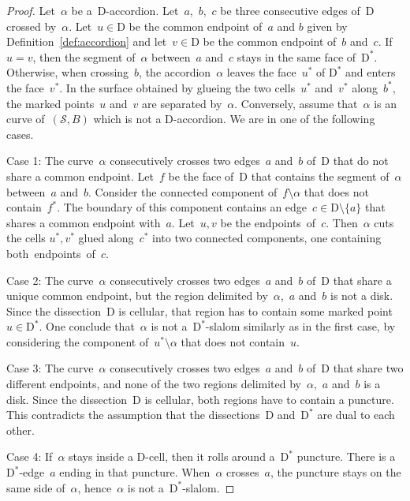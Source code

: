 \documentclass{amsart}
\theoremstyle{definition}
\newcommand{\surface}{\mathcal{S}} %
\newcommand{\dual}{^*} %
\newcommand{\dissection}{\mathrm{D}} %
\begin{document}
\begin{proof}
Let~$\alpha$ be a~$\dissection$-accordion.
Let~$a$,~$b$,~$c$ be three consecutive edges of~$\dissection$ crossed by~$\alpha$.
Let~$u \in \dissection$ be the common endpoint of~$a$ and $b$ given by Definition~\ref{def:accordion} and let~$v \in \dissection$ be the common endpoint of~$b$ and~$c$.
If $u = v$, then the segment of~$\alpha$ between~$a$ and~$c$ stays in the same face of~$\dissection\dual$.
Otherwise, when crossing~$b$, the accordion~$\alpha$ leaves the face~$u\dual$ of $\dissection\dual$ and enters the face~$v\dual$.
In the surface obtained by glueing the two cells~$u\dual$ and~$v\dual$ along~$b\dual$, the marked points~$u$ and~$v$ are separated by~$\alpha$.
Conversely, assume that~$\alpha$ is an curve of~$(\surface, B)$ which is not a $\dissection$-accordion.
We are in one of the following cases.

Case 1: The curve~$\alpha$ consecutively crosses two edges~$a$ and~$b$ of~$\dissection$ that do not share a common endpoint.
Let~$f$ be the face of~$\dissection$ that contains the segment of~$\alpha$ between~$a$ and~$b$.
Consider the connected component of~$f\setminus\alpha$ that does not contain~$f\dual$.
The boundary of this component contains an edge~$c \in \dissection \setminus \{a\}$ that shares a common endpoint with~$a$.
Let~$u,v$ be the endpoints~of~$c$.
Then~$\alpha$ cuts the cells $u\dual,v\dual$ glued along~$c\dual$ into two connected components, one containing both~endpoints~of~$c$.

Case 2: The curve~$\alpha$ consecutively crosses two edges~$a$ and~$b$ of~$\dissection$ that share a unique common endpoint, but the region delimited by~$\alpha$,~$a$ and~$b$ is not a disk.
Since the dissection~$\dissection$ is cellular, that region has to contain some marked point~$u \in \dissection\dual$.
One conclude that~$\alpha$ is not a~$\dissection\dual$-slalom similarly as in the first case, by considering the component of~$u\dual \setminus \alpha$ that does not contain~$u$.

Case 3: The curve~$\alpha$ consecutively crosses two edges~$a$ and~$b$ of~$\dissection$ that share two different endpoints, and none of the two regions delimited by~$\alpha$,~$a$ and~$b$ is a disk.
Since the dissection~$\dissection$ is cellular, both regions have to contain a puncture.
This contradicts the assumption that the dissections~$\dissection$ and~$\dissection\dual$ are dual to each other.

Case 4: If~$\alpha$ stays inside a $\dissection$-cell, then it rolls around a~$\dissection\dual$ puncture.
There is a~$\dissection\dual$-edge~$a$ ending in that puncture. When~$\alpha$ crosses~$a$, the puncture stays on the same side of~$\alpha$, hence~$\alpha$ is not a~$\dissection\dual$-slalom.
\end{proof}
\end{document}
